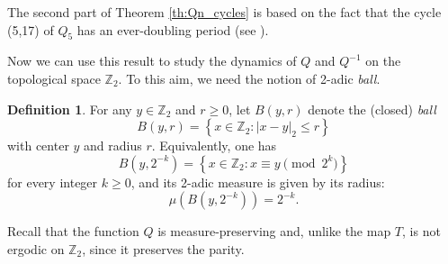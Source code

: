 \documentclass[12pt]{article}
\theoremstyle{definition}
\newtheorem{definition}{Definition}
\begin{document}
The second part of Theorem \ref{th:Qn_cycles} is based on the fact that the cycle (5,17) of $Q_5$ has an ever-doubling period (see \cite{Ber96}).

Now we can use this result to study the dynamics of $Q$ and $Q^{-1}$ on the topological space $\mathbb Z_{2}$. To this aim, we need the notion of 2-adic {\em ball}.

\begin{definition} \label{def:ball}
For any $y \in \mathbb Z_{2}$ and $r \geq 0$, let $B(y,r)$ denote the (closed) {\em ball} $$B(y,r)=\left\lbrace x \in \mathbb Z_{2}: |x-y|_{2} \leq r \right\rbrace $$  with center $y$ and radius $r$. Equivalently, one has $$B(y,2^{-k}) = \left\lbrace x \in \mathbb Z_{2}: x \equiv y \pmod{2^{k}} \right\rbrace$$ for every integer $k \geq 0$, and its 2-adic measure is given by its radius: $$\mu\left( B(y,2^{-k})\right) = 2^{-k}.$$
\end{definition}

Recall that the function $Q$ is measure-preserving \cite{Ber96,Lag85} and, unlike the map $T$, is not ergodic on $\mathbb{Z}_2$, since it preserves the parity.
\end{document}
